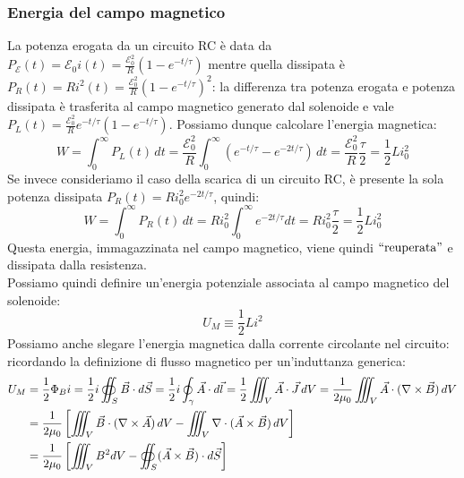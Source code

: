 \documentclass[]{article}
\newcommand{\E}{\mathcal{E}}
\begin{document}
\subsubsection{Energia del campo magnetico}

La potenza erogata da un circuito RC è data da $ P_{\E}(t) = \E_0 i(t) = \frac{\E_0^2}{R} (1 - e^{-t/\tau}) $ mentre quella dissipata è $ P_R(t) = R i^2(t) = \frac{\E_0^2}{R} (1 - e^{-t/\tau})^2 $: la differenza tra potenza erogata e potenza dissipata è trasferita al campo magnetico generato dal solenoide e vale $ P_L(t) = \frac{\E_0^2}{R} e^{-t/\tau} (1 - e^{-t/\tau}) $. Possiamo dunque calcolare l'energia magnetica:
\begin{equation}
	W = \int_0^{\infty} P_L(t) \, dt = \frac{\E_0^2}{R} \int_0^{\infty} (e^{-t/\tau} - e^{-2t/\tau}) \, dt = \frac{\E_0^2}{R}\frac{\tau}{2} = \frac{1}{2}L i_0^2
	\label{eq:33}
\end{equation}
%
Se invece consideriamo il caso della scarica di un circuito RC, è presente la sola potenza dissipata $ P_R(t) = Ri_0^2 e^{-2t/\tau} $, quindi:
\begin{equation}
	W = \int_0^{\infty} P_R(t) \, dt = Ri_0^2 \int_0^{\infty} e^{-2t/\tau} dt = R i_0^2 \frac{\tau}{2} = \frac{1}{2} L i_0^2
	\label{eq:34}
\end{equation}
Questa energia, immagazzinata nel campo magnetico, viene quindi $ ``\text{reuperata}" $ e dissipata dalla resistenza. \\ 
%
Possiamo quindi definire un'energia potenziale associata al campo magnetico del solenoide:
\begin{equation}
	U_M \equiv \frac{1}{2} Li^2
	\label{eq:35}
\end{equation}
%
Possiamo anche slegare l'energia magnetica dalla corrente circolante nel circuito: ricordando la definizione di flusso magnetico per un'induttanza generica:
\begin{equation}
	\begin{split}
		U_M &= \frac{1}{2} \Phi_B i = \frac{1}{2} i \oiint_S \vec{B} \cdot d\vec{S} = \frac{1}{2} i \oint_{\gamma} \vec{A} \cdot d\vec{l} = \frac{1}{2} \iiint_V \vec{A}\cdot\vec{J} \,dV = \frac{1}{2\mu_0} \iiint_V \vec{A}\cdot (\nabla\times\vec{B}) \,dV \\ 
		    &= \frac{1}{2\mu_0} \left[ \iiint_V \vec{B}\cdot (\nabla\times\vec{A}) \,dV - \iiint_V \nabla\cdot (\vec{A}\times\vec{B}) \,dV \right] \\ 
		    &= \frac{1}{2\mu_0} \left[ \iiint_V B^2 dV - \oiint_S (\vec{A}\times\vec{B}) \cdot d\vec{S} \right]
	\end{split}
	\label{eq:36}
\end{equation}
\end{document}
